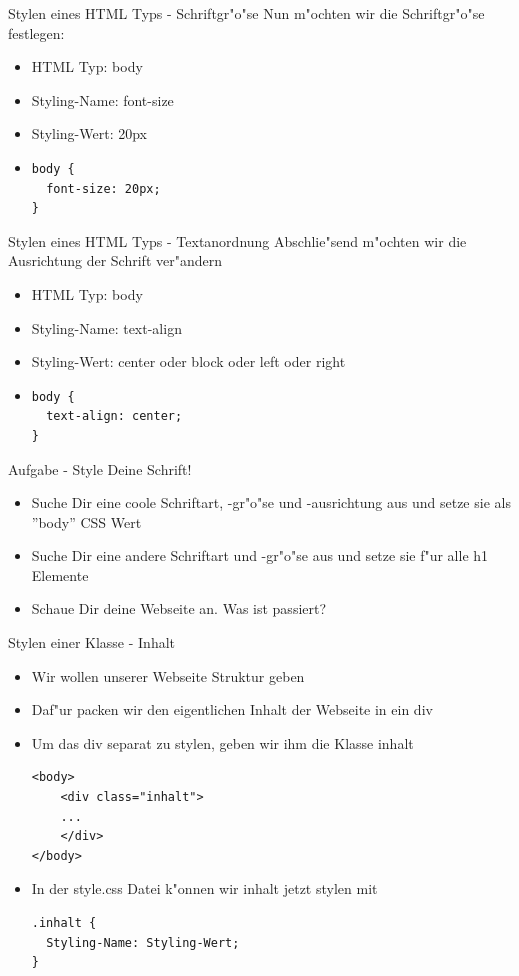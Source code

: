 \documentclass[18pt]{beamer}
\begin{document}
\begin{frame}[fragile]{Stylen eines HTML Typs - Schriftgr"o"se}
Nun m"ochten wir die Schriftgr"o"se festlegen:
\begin {itemize}
\item HTML Typ: body
\item Styling-Name: font-size
\item Styling-Wert: 20px
\pause
\item 
\begin{lstlisting}
body {
  font-size: 20px;
}
\end{lstlisting}
\end {itemize}
\end{frame}

\begin{frame}[fragile]{Stylen eines HTML Typs - Textanordnung}
Abschlie"send m"ochten wir die Ausrichtung der Schrift ver"andern
\begin {itemize}
\item HTML Typ: body
\item Styling-Name: text-align
\item Styling-Wert: center oder block oder left oder right
\pause
\item 
\begin{lstlisting}
body {
  text-align: center;
}
\end{lstlisting}
\end {itemize}
\end{frame}

\begin{frame}[fragile]{Aufgabe - Style Deine Schrift!}
\begin {itemize}
\item Suche Dir eine coole Schriftart, -gr"o"se und -ausrichtung aus und setze sie als ''body'' CSS Wert
\item Suche Dir eine andere Schriftart und -gr"o"se aus und setze sie f"ur alle h1 Elemente
\item Schaue Dir deine Webseite an. Was ist passiert? 
\end {itemize}
\end{frame}

\begin{frame}[fragile]{Stylen einer Klasse - Inhalt}
\begin{itemize}
\item Wir wollen unserer Webseite Struktur geben
\item Daf"ur packen wir den eigentlichen Inhalt der Webseite in ein div
\item Um das div separat zu stylen, geben wir ihm die Klasse inhalt
\begin{lstlisting}
<body>
	<div class="inhalt">
	...
	</div>
</body>
\end{lstlisting}
\pause
\item In der style.css Datei k"onnen wir inhalt jetzt stylen mit
\begin{lstlisting}
.inhalt {
  Styling-Name: Styling-Wert;
}
\end{lstlisting}
\end{itemize}
\end{frame}
\end{document}
